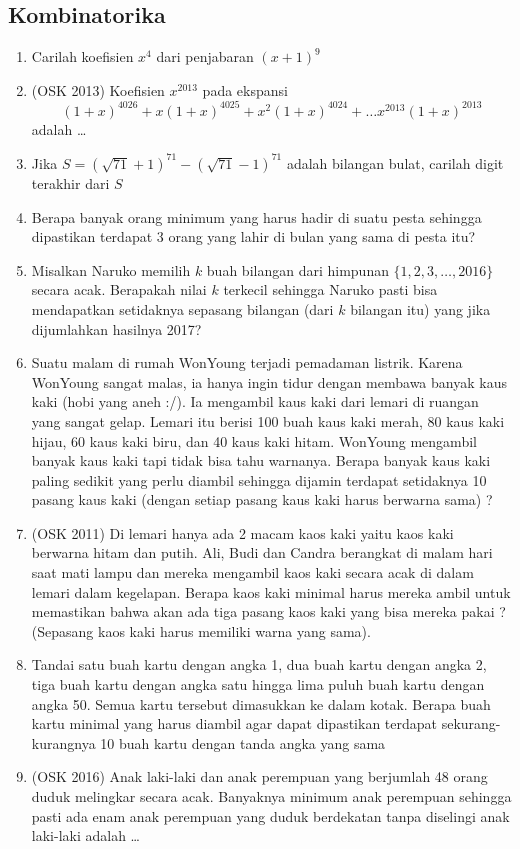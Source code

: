 \subsection{Kombinatorika}
\begin{enumerate}
    \item Carilah koefisien $x^4$ dari penjabaran $(x+1)^9$
    
    \item (OSK 2013) Koefisien $x^{2013}$ pada ekspansi
    $$(1+x)^{4026}+x(1+x)^{4025}+x^2(1+x)^{4024}+\dots x^{2013}(1+x)^{2013}$$
    adalah \dots
    
    \item Jika $S=(\sqrt{71}+1)^{71}-(\sqrt{71}-1)^{71}$ adalah bilangan bulat, carilah digit terakhir dari $S$
    \item Berapa banyak orang minimum yang harus hadir di suatu pesta sehingga dipastikan terdapat 3 orang yang lahir di bulan yang sama di pesta itu?
    
    \item Misalkan Naruko memilih $k$ buah bilangan dari himpunan $\{1,2,3,\dots,2016\}$ secara acak. Berapakah nilai $k$ terkecil sehingga Naruko pasti bisa mendapatkan setidaknya sepasang bilangan (dari $k$ bilangan itu) yang jika dijumlahkan hasilnya 2017?
    
    \item Suatu malam di rumah WonYoung terjadi pemadaman listrik. Karena WonYoung sangat malas, ia hanya ingin tidur dengan membawa banyak kaus kaki (hobi yang aneh :/). Ia mengambil kaus kaki dari lemari di ruangan yang sangat gelap. Lemari itu berisi 100 buah kaus kaki merah, 80 kaus kaki hijau, 60 kaus kaki biru, dan 40 kaus kaki hitam. WonYoung mengambil banyak kaus kaki tapi tidak bisa tahu warnanya. Berapa banyak kaus kaki paling sedikit yang perlu diambil sehingga dijamin terdapat setidaknya 10 pasang kaus kaki (dengan setiap pasang kaus kaki harus berwarna sama) ?
    
    \item (OSK 2011) Di lemari hanya ada 2 macam kaos kaki yaitu kaos kaki berwarna hitam dan putih. 
Ali, Budi dan Candra berangkat di malam hari saat mati lampu dan mereka mengambil kaos kaki 
secara acak di dalam lemari dalam kegelapan. Berapa kaos kaki minimal harus mereka ambil untuk 
memastikan bahwa akan ada tiga pasang kaos kaki yang bisa mereka pakai ? (Sepasang kaos kaki harus 
memiliki warna yang sama).
    
    \item Tandai satu buah kartu dengan angka 1, dua buah kartu dengan angka 2, tiga buah kartu dengan 
angka satu hingga lima puluh buah kartu dengan angka 50. Semua kartu tersebut dimasukkan ke 
dalam kotak. Berapa buah kartu minimal yang harus diambil agar dapat dipastikan terdapat sekurang-kurangnya 10 buah kartu dengan tanda angka yang sama 

    \item (OSK 2016)
	Anak laki-laki dan anak perempuan yang berjumlah 48 orang duduk melingkar secara acak.
Banyaknya minimum anak perempuan sehingga pasti ada enam anak perempuan yang duduk
berdekatan tanpa diselingi anak laki-laki adalah \dots
    
\end{enumerate}

